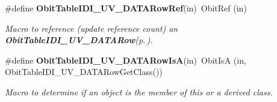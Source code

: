 \begin{CompactItemize}
\#define {\bf Obit\-Table\-IDI\_\-UV\_\-DATARow\-Ref}(in)\ Obit\-Ref (in)
\begin{CompactList}\small\item\em Macro to reference (update reference count) an {\bf Obit\-Table\-IDI\_\-UV\_\-DATARow}{\rm (p.\,\pageref{structObitTableIDI__UV__DATARow})}. \item\end{CompactList}\item 
\#define {\bf Obit\-Table\-IDI\_\-UV\_\-DATARow\-Is\-A}(in)\ Obit\-Is\-A (in, Obit\-Table\-IDI\_\-UV\_\-DATARow\-Get\-Class())
\begin{CompactList}\small\item\em Macro to determine if an object is the member of this or a derived class. \item\end{CompactList}\end{CompactItemize}
